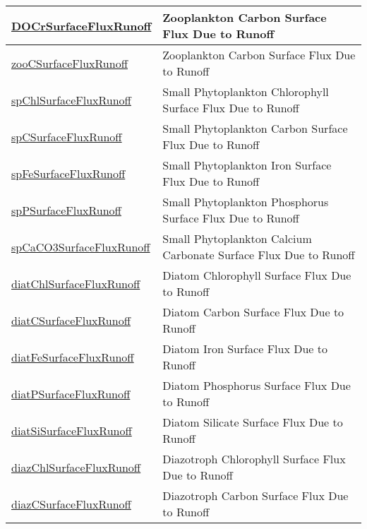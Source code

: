 {\begin{center}
\begin{longtable}{| p{2.0in} | p{4.0in} |}
    \hline
    \hyperref[subsec:var_sec_forcing_DOCrSurfaceFluxRunoff]{DOCrSurfaceFluxRunoff} & Zooplankton Carbon Surface Flux Due to Runoff \\
    \hline
    \hyperref[subsec:var_sec_forcing_zooCSurfaceFluxRunoff]{zooCSurfaceFluxRunoff} & Zooplankton Carbon Surface Flux Due to Runoff \\
    \hline
    \hyperref[subsec:var_sec_forcing_spChlSurfaceFluxRunoff]{spChlSurfaceFluxRunoff} & Small Phytoplankton Chlorophyll Surface Flux Due to Runoff \\
    \hline
    \hyperref[subsec:var_sec_forcing_spCSurfaceFluxRunoff]{spCSurfaceFluxRunoff} & Small Phytoplankton Carbon Surface Flux Due to Runoff \\
    \hline
    \hyperref[subsec:var_sec_forcing_spFeSurfaceFluxRunoff]{spFeSurfaceFluxRunoff} & Small Phytoplankton Iron Surface Flux Due to Runoff \\
    \hline
    \hyperref[subsec:var_sec_forcing_spPSurfaceFluxRunoff]{spPSurfaceFluxRunoff} & Small Phytoplankton Phosphorus Surface Flux Due to Runoff \\
    \hline
    \hyperref[subsec:var_sec_forcing_spCaCO3SurfaceFluxRunoff]{spCaCO3SurfaceFluxRunoff} & Small Phytoplankton Calcium Carbonate Surface Flux Due to Runoff \\
    \hline
    \hyperref[subsec:var_sec_forcing_diatChlSurfaceFluxRunoff]{diatChlSurfaceFluxRunoff} & Diatom Chlorophyll Surface Flux Due to Runoff \\
    \hline
    \hyperref[subsec:var_sec_forcing_diatCSurfaceFluxRunoff]{diatCSurfaceFluxRunoff} & Diatom Carbon Surface Flux Due to Runoff \\
    \hline
    \hyperref[subsec:var_sec_forcing_diatFeSurfaceFluxRunoff]{diatFeSurfaceFluxRunoff} & Diatom Iron Surface Flux Due to Runoff \\
    \hline
    \hyperref[subsec:var_sec_forcing_diatPSurfaceFluxRunoff]{diatPSurfaceFluxRunoff} & Diatom Phosphorus Surface Flux Due to Runoff \\
    \hline
    \hyperref[subsec:var_sec_forcing_diatSiSurfaceFluxRunoff]{diatSiSurfaceFluxRunoff} & Diatom Silicate Surface Flux Due to Runoff \\
    \hline
    \hyperref[subsec:var_sec_forcing_diazChlSurfaceFluxRunoff]{diazChlSurfaceFluxRunoff} & Diazotroph Chlorophyll Surface Flux Due to Runoff \\
    \hline
    \hyperref[subsec:var_sec_forcing_diazCSurfaceFluxRunoff]{diazCSurfaceFluxRunoff} & Diazotroph Carbon Surface Flux Due to Runoff \\

\end{longtable}
\end{center}}
